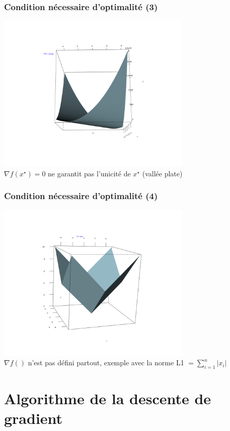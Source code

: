 \documentclass[12pt]{beamer}
\begin{document}
\begin{frame}
\frametitle{Condition nécessaire d’optimalité (3)} 
\begin{center}
\includegraphics[width=0.7\textwidth]{flat_valley.png} \\
$\nabla f(x^\star) = 0$ ne garantit pas l’unicité de $x^\star$ (vallée plate)
\end{center}
\end{frame}

\begin{frame}
\frametitle{Condition nécessaire d’optimalité (4)} 
\begin{center}
\includegraphics[width=0.7\textwidth]{L1norm.png} \\
$\nabla f()$ n’est pas défini partout, exemple avec la norme L1 $= \sum_{i=1}^n |x_i|$
\end{center}
\end{frame}


\section{Algorithme de la descente de gradient}
\end{document}
